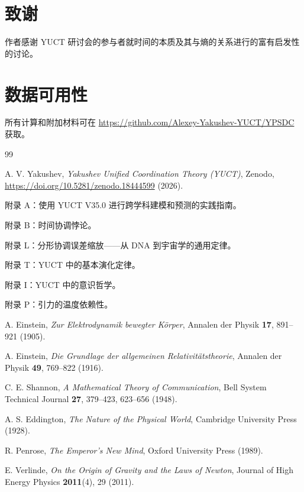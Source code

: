 \documentclass[12pt,a4paper]{article}
\begin{document}
	\section*{致谢}
	
	作者感谢 YUCT 研讨会的参与者就时间的本质及其与熵的关系进行的富有启发性的讨论。
	
	\section*{数据可用性}
	
	所有计算和附加材料可在 \url{https://github.com/Alexey-Yakushev-YUCT/YPSDC} 获取。
	
	\begin{thebibliography}{99}
		
		A. V. Yakushev, \emph{Yakushev Unified Coordination Theory (YUCT)}, Zenodo, \url{https://doi.org/10.5281/zenodo.18444599} (2026).
		
		附录 A：使用 YUCT V35.0 进行跨学科建模和预测的实践指南。
		
		附录 B：时间协调悖论。
		
		附录 L：分形协调误差缩放——从 DNA 到宇宙学的通用定律。
		
		附录 T：YUCT 中的基本演化定律。
		
		附录 I：YUCT 中的意识哲学。
		
		附录 P：引力的温度依赖性。
		
		A. Einstein, \emph{Zur Elektrodynamik bewegter Körper}, Annalen der Physik \textbf{17}, 891–921 (1905).
		
		A. Einstein, \emph{Die Grundlage der allgemeinen Relativitätstheorie}, Annalen der Physik \textbf{49}, 769–822 (1916).
		
		C. E. Shannon, \emph{A Mathematical Theory of Communication}, Bell System Technical Journal \textbf{27}, 379–423, 623–656 (1948).
		
		A. S. Eddington, \emph{The Nature of the Physical World}, Cambridge University Press (1928).
		
		R. Penrose, \emph{The Emperor's New Mind}, Oxford University Press (1989).
		
		E. Verlinde, \emph{On the Origin of Gravity and the Laws of Newton}, Journal of High Energy Physics \textbf{2011}(4), 29 (2011).
		

\end{thebibliography}
\end{document}
